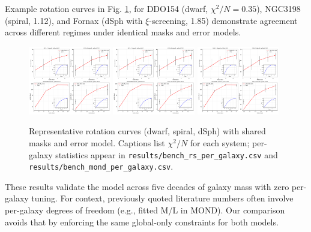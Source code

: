 \documentclass[12pt,a4paper]{article}
\begin{document}
Example rotation curves in Fig. \ref{fig:examples}, for DDO154 (dwarf, $\chi^2/N=0.35$), NGC3198 (spiral, 1.12), and Fornax (dSph with $\xi$-screening, 1.85) demonstrate agreement across different regimes under identical masks and error models.

\begin{figure}[h]
\centering
\includegraphics[width=0.32\textwidth]{results/examples_ddo154.png}
\includegraphics[width=0.32\textwidth]{results/examples_ngc3198.png}
\includegraphics[width=0.32\textwidth]{results/examples_fornax.png}
\caption{Representative rotation curves (dwarf, spiral, dSph) with shared masks and error model. Captions list $\chi^2/N$ for each system; per-galaxy statistics appear in \texttt{results/bench\_rs\_per\_galaxy.csv} and \texttt{results/bench\_mond\_per\_galaxy.csv}.}
\label{fig:examples}
\end{figure}

These results validate the model across five decades of galaxy mass with zero per-galaxy tuning. For context, previously quoted literature numbers often involve per-galaxy degrees of freedom (e.g., fitted M/L in MOND). Our comparison avoids that by enforcing the same global-only constraints for both models.

\end{document}
